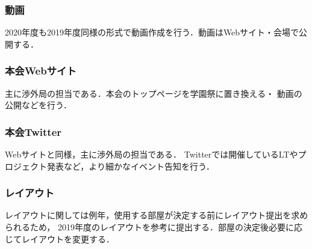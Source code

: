 \subsubsection*{動画}
2020年度も2019年度同様の形式で動画作成を行う．動画はWebサイト・会場で公開する．

\subsubsection*{本会Webサイト}
主に渉外局の担当である．本会のトップページを学園祭に置き換える・
動画の公開などを行う．

\subsubsection*{本会Twitter}
Webサイトと同様，主に渉外局の担当である．
Twitterでは開催しているLTやプロジェクト発表など，より細かなイベント告知を行う．

\subsubsection*{レイアウト}
レイアウトに関しては例年，使用する部屋が決定する前にレイアウト提出を求められるため，
2019年度のレイアウトを参考に提出する．部屋の決定後必要に応じてレイアウトを変更する．

